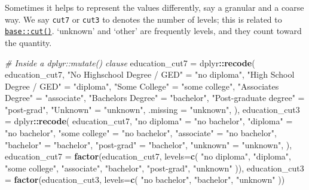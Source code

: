 \documentclass[
]{book}
\newenvironment{Shaded}{\begin{snugshade}}{\end{snugshade}}
\newcommand{\CommentTok}[1]{\textcolor[rgb]{0.56,0.35,0.01}{\textit{#1}}}
\newcommand{\DataTypeTok}[1]{\textcolor[rgb]{0.13,0.29,0.53}{#1}}
\newcommand{\KeywordTok}[1]{\textcolor[rgb]{0.13,0.29,0.53}{\textbf{#1}}}
\newcommand{\NormalTok}[1]{#1}
\newcommand{\OperatorTok}[1]{\textcolor[rgb]{0.81,0.36,0.00}{\textbf{#1}}}
\newcommand{\StringTok}[1]{\textcolor[rgb]{0.31,0.60,0.02}{#1}}
\begin{document}
Sometimes it helps to represent the values differently, say a granular and a coarse way. We say \texttt{cut7} or \texttt{cut3} to denotes the number of levels; this is related to \href{https://stat.ethz.ch/R-manual/R-devel/library/base/html/cut.html}{\texttt{base::cut()}}. `unknown' and `other' are frequently levels, and they count toward the quantity.

\begin{Shaded}
\begin{Highlighting}[]
\CommentTok{\# Inside a dplyr::mutate() clause}
\NormalTok{education\_cut7      =}\StringTok{ }\NormalTok{dplyr}\OperatorTok{::}\KeywordTok{recode}\NormalTok{(}
\NormalTok{  education\_cut7,}
  \StringTok{"No Highschool Degree / GED"}\NormalTok{  =}\StringTok{ "no diploma"}\NormalTok{,}
  \StringTok{"High School Degree / GED"}\NormalTok{    =}\StringTok{ "diploma"}\NormalTok{,}
  \StringTok{"Some College"}\NormalTok{                =}\StringTok{ "some college"}\NormalTok{,}
  \StringTok{"Associate\textquotesingle{}s Degree"}\NormalTok{          =}\StringTok{ "associate"}\NormalTok{,}
  \StringTok{"Bachelor\textquotesingle{}s Degree"}\NormalTok{           =}\StringTok{ "bachelor"}\NormalTok{,}
  \StringTok{"Post{-}graduate degree"}\NormalTok{        =}\StringTok{ "post{-}grad"}\NormalTok{,}
  \StringTok{"Unknown"}\NormalTok{                     =}\StringTok{ "unknown"}\NormalTok{,}
  \DataTypeTok{.missing                      =} \StringTok{"unknown"}\NormalTok{,}
\NormalTok{),}
\NormalTok{education\_cut3      =}\StringTok{ }\NormalTok{dplyr}\OperatorTok{::}\KeywordTok{recode}\NormalTok{(}
\NormalTok{  education\_cut7,}
  \StringTok{"no diploma"}\NormalTok{    =}\StringTok{ "no bachelor"}\NormalTok{,}
  \StringTok{"diploma"}\NormalTok{       =}\StringTok{ "no bachelor"}\NormalTok{,}
  \StringTok{"some college"}\NormalTok{  =}\StringTok{ "no bachelor"}\NormalTok{,}
  \StringTok{"associate"}\NormalTok{     =}\StringTok{ "no bachelor"}\NormalTok{,}
  \StringTok{"bachelor"}\NormalTok{      =}\StringTok{ "bachelor"}\NormalTok{,}
  \StringTok{"post{-}grad"}\NormalTok{     =}\StringTok{ "bachelor"}\NormalTok{,}
  \StringTok{"unknown"}\NormalTok{       =}\StringTok{ "unknown"}\NormalTok{,}
\NormalTok{),}
\NormalTok{education\_cut7 =}\StringTok{ }\KeywordTok{factor}\NormalTok{(education\_cut7, }\DataTypeTok{levels=}\KeywordTok{c}\NormalTok{(}
  \StringTok{"no diploma"}\NormalTok{,}
  \StringTok{"diploma"}\NormalTok{,}
  \StringTok{"some college"}\NormalTok{,}
  \StringTok{"associate"}\NormalTok{,}
  \StringTok{"bachelor"}\NormalTok{,}
  \StringTok{"post{-}grad"}\NormalTok{,}
  \StringTok{"unknown"}
\NormalTok{)),}
\NormalTok{education\_cut3 =}\StringTok{ }\KeywordTok{factor}\NormalTok{(education\_cut3, }\DataTypeTok{levels=}\KeywordTok{c}\NormalTok{(}
  \StringTok{"no bachelor"}\NormalTok{,}
  \StringTok{"bachelor"}\NormalTok{,}
  \StringTok{"unknown"}
\NormalTok{))}
\end{Highlighting}
\end{Shaded}
\end{document}
